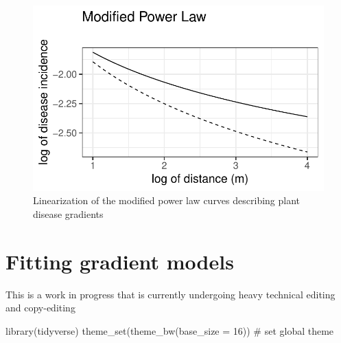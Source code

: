 \documentclass[
  letterpaper,
  DIV=11,
  numbers=noendperiod]{scrreprt}
\newenvironment{Shaded}{\begin{snugshade}}{\end{snugshade}}
\newcommand{\AttributeTok}[1]{\textcolor[rgb]{0.40,0.45,0.13}{#1}}
\newcommand{\CommentTok}[1]{\textcolor[rgb]{0.37,0.37,0.37}{#1}}
\newcommand{\DecValTok}[1]{\textcolor[rgb]{0.68,0.00,0.00}{#1}}
\newcommand{\FunctionTok}[1]{\textcolor[rgb]{0.28,0.35,0.67}{#1}}
\newcommand{\NormalTok}[1]{\textcolor[rgb]{0.00,0.23,0.31}{#1}}
\begin{document}
\begin{figure}[H]

{\centering \includegraphics{spatial-models_files/figure-pdf/fig-power2-1.pdf}

}

\caption{\label{fig-power2}Linearization of the modified power law
curves describing plant disease gradients}

\end{figure}

\hypertarget{fitting-gradient-models}{%
\chapter{Fitting gradient models}\label{fitting-gradient-models}}

\begin{tcolorbox}[enhanced jigsaw, breakable, left=2mm, opacityback=0, rightrule=.15mm, toprule=.15mm, colframe=quarto-callout-note-color-frame, arc=.35mm, colback=white, bottomrule=.15mm, leftrule=.75mm]
\begin{minipage}[t]{5.5mm}
\textcolor{quarto-callout-note-color}{\faInfo}
\end{minipage}%
\begin{minipage}[t]{\textwidth - 5.5mm}

This is a work in progress that is currently undergoing heavy technical
editing and copy-editing

\end{minipage}%
\end{tcolorbox}

\begin{Shaded}
\begin{Highlighting}[]
\FunctionTok{library}\NormalTok{(tidyverse)}
\FunctionTok{theme\_set}\NormalTok{(}\FunctionTok{theme\_bw}\NormalTok{(}\AttributeTok{base\_size =} \DecValTok{16}\NormalTok{)) }\CommentTok{\# set global theme}
\end{Highlighting}
\end{Shaded}
\end{document}
